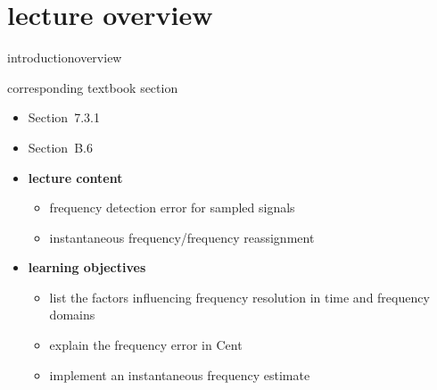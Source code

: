 


\subtitle{Module B.6: Frequency Resolution \& Instantaneous Frequency}


	

    \section[overview]{lecture overview}
        \begin{frame}{introduction}{overview}
            \begin{block}{corresponding textbook section}
                \begin{itemize}
                    \item Section~7.3.1
                    \item Section~B.6
                \end{itemize}
            \end{block}

            \begin{itemize}
                \item   \textbf{lecture content}
                    \begin{itemize}
                        \item   frequency detection error for sampled signals
                        \item   instantaneous frequency/frequency reassignment
                    \end{itemize}
                \bigskip
                \item<2->   \textbf{learning objectives}
                    \begin{itemize}
                        \item   list the factors influencing frequency resolution in time and frequency domains
                        \item   explain the frequency error in Cent
                        \item   implement an instantaneous frequency estimate
                    \end{itemize}
            \end{itemize}
        \end{frame}

